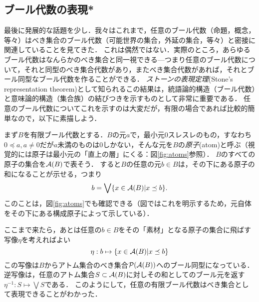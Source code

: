 \documentclass[11pt,a4paper, dvipdfmx]{jsarticle}
\begin{document}



\subsection{ブール代数の表現*}

最後に発展的な話題を少し．我々はこれまで，任意のブール代数（命題，概念，等々）はべき集合のブール代数（可能世界の集合，外延の集合，等々）と密接に関連していることを見てきた．
これは偶然ではない．実際のところ，あらゆるブール代数はなんらかのべき集合と同一視できる---つまり任意のブール代数について，それと同型のべき集合代数があり，またべき集合代数があれば，それとブール同型なブール代数を作ることができる．
\emph{ストーンの表現定理}(Stone's representation theorem)として知られるこの結果は，統語論的構造（ブール代数）と意味論的構造（集合族）の結びつきを示すものとして非常に重要である．
任意のブール代数についてこれを示すのは大変だが，有限の場合であれば比較的簡単なので，以下に素描しよう．

まず$B$を有限ブール代数とする．$B$の元$a$で，最小元$0$スレスレのもの，すなわち$0 \preceq a, a \neq 0$だが$a$未満のものは$0$しかない，そんな元を$B$の\emph{原子}(atom)と呼ぶ（視覚的には原子は最小元の「直上の層」にくる：図\ref{fig:atoms}参照）．
$B$のすべての原子の集合を$\mathcal{A}(B)$で表そう．
すると$B$の任意の元$b \in B$は，その下にある原子の和になることが示せる，つまり
\[ b = \bigvee \{ x \in \mathcal{A}(B) | x \preceq b \}. \]
このことは，図\ref{fig:atoms}でも確認できる（図ではこれを明示するため，元自体をその下にある構成原子によって示している）．

ここまで来たら，あとは任意の$b \in B$をその「素材」となる原子の集合に飛ばす写像$\eta$を考えればよい
\[ \eta: b \mapsto \{ x \in \mathcal{A}(B) | x \preceq b \} \]
この写像は$B$からアトム集合のべき集合$\mathcal{P}(\mathcal{A}(B))$へのブール同型になっている．
逆写像は，任意のアトム集合$S \subset \mathcal{A}(B)$に対しその和としてのブール元を返す$\eta^{-1}: S \mapsto \bigvee S$である．
このようにして，任意の有限ブール代数はべき集合として表現できることがわかった．
\end{document}

